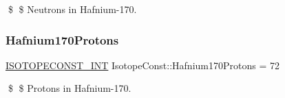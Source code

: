 \$ \$ Neutrons in Hafnium-\/170. \mbox{\label{group___isotope_const-_hafnium-_hf170_gad8ae69cde3f0750c2e19a1d4aeb2bda0}} 
\subsubsection{\texorpdfstring{Hafnium170\+Protons}{Hafnium170Protons}}
{\footnotesize\ttfamily \mbox{\hyperlink{group___isotope_const-_macros_ga5f18360b3e99483a35c32d789e62621c}{I\+S\+O\+T\+O\+P\+E\+C\+O\+N\+S\+T\+\_\+\+I\+NT}} Isotope\+Const\+::\+Hafnium170\+Protons = 72}

\$ \$ Protons in Hafnium-\/170. 